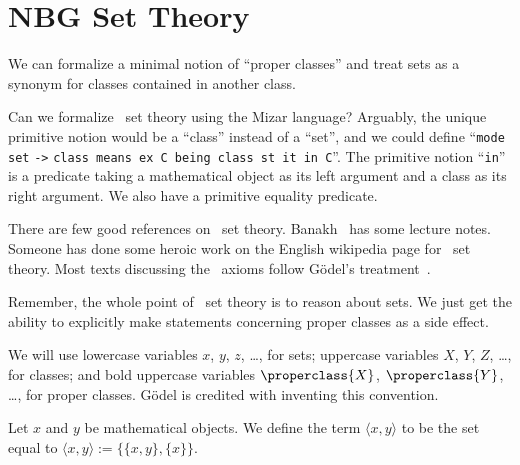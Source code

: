 \section{NBG Set Theory}\label{sec:set:nbg}
\begin{node}\label{nbg-0000}%
We can formalize a minimal notion of ``proper classes'' and treat
sets as a synonym for classes contained in another class.
\end{node}

\begin{puzzle}\label{nbg-0001}%
Can we formalize \NBG\ set theory using the Mizar language? Arguably, the
unique primitive notion would be a ``class'' instead of a ``set'', and
we could define ``\texttt{mode set} \verb|->| \texttt{class means ex C
  being class st it in C}''. The primitive notion ``\texttt{in}'' is a
predicate taking a mathematical object as its left argument and a class
as its right argument. We also have a primitive equality predicate.

\begin{node}[References]\label{nbg-0002}%
There are few good references on \NBG\ set
theory. Banakh~\cite{banakh2023classical} has some lecture
notes. Someone has done some heroic work on the English wikipedia page
for \NBG\ set theory. Most texts discussing the \NBG\ axioms follow
G\"{o}del's treatment~\cite{godel1940consistency}.
\end{node}

\begin{node}\label{nbg-0003}%
Remember, the whole point of \NBG\ set theory is to reason about sets. We
just get the ability to explicitly make statements concerning proper
classes as a side effect.
\end{node}
\end{puzzle}

\begin{node}[Conventions]\label{nbg-000F}%
We will use lowercase variables $x$, $y$, $z$, \dots, for sets;
uppercase variables $X$, $Y$, $Z$, \dots, for classes; and bold
uppercase variables $\properclass{X}$, $\properclass{Y}$, \dots, for proper classes.
G\"{o}del is credited with inventing this convention.
\end{node}

\begin{definition}\label{nbg-0007}%
Let $x$ and $y$ be mathematical objects. We define the term $\langle x,y\rangle$
to be the set equal to $\langle x,y\rangle := \{\{x,y\}, \{x\}\}$.
\end{definition}

